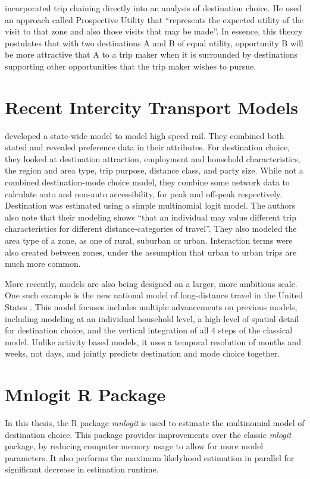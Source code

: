 \textcite{Kitamura84} incorporated trip chaining directly into an analysis of destination choice. He used an approach called Prospective Utility that \enquote{represents the expected utility of the visit to that zone and also those visits that may be made}. In essence, this theory postulates that with two destinations A and B of equal utility, opportunity B will be more attractive that A to a trip maker when it is surrounded by destinations supporting other opportunities that the trip maker wishes to pursue.

\section{Recent Intercity Transport Models}
\autocite{Outwater10} developed a state-wide model to model high speed rail. They combined both stated and revealed preference data in their attributes. For destination choice, they looked at destination attraction, employment and household characteristics, the region and area type, trip purpose, distance class, and party size. While not a combined destination-mode choice model, they combine some network data to calculate auto and non-auto accessibility, for peak and off-peak respectively. Destination was estimated using a simple multinomial logit model. The authors also note that their modeling shows \enquote{that an individual may value different trip characteristics for different distance-categories of travel}. They also modeled the area type of a zone, as one of rural, suburban or urban. Interaction terms were also created between zones, under the assumption that urban to urban trips are much more common.

More recently, models are also being designed on a larger, more ambitious scale. One such example is the new national model of long-distance travel in the United States \parencite{Outwater15}. This model focuses includes multiple advancements on previous models, including modeling at an individual household level, a high level of spatial detail for destination choice, and the vertical integration of all 4 steps of the classical model. Unlike activity based models, it uses a temporal resolution of months and weeks, not days, and jointly predicts destination and mode choice together. 

\section{Mnlogit R Package}
\label{section:mnlogit-structure}
\label{section:mnlogit}
In this thesis, the R package \textit{mnlogit} \parencite{hasan2014fast} is used to estimate the multinomial model of destination choice. This package provides improvements over the classic \textit{mlogit} package, by reducing computer memory usage to allow for more model parameters. It also performs the maximum likelyhood estimation in parallel for significant decrease in estimation runtime.
